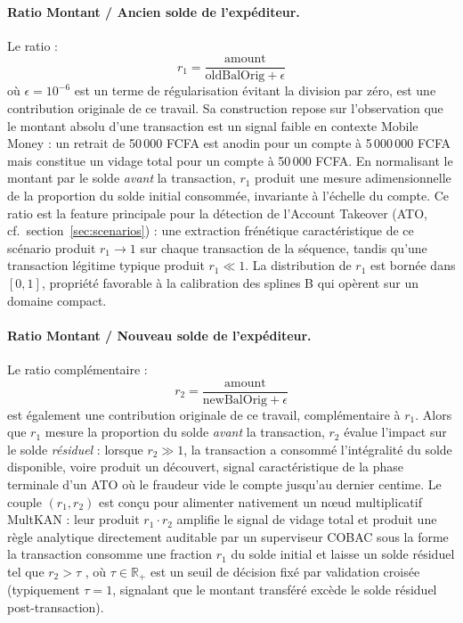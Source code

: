 \documentclass[11pt,a4paper,oneside]{report}
\theoremstyle{definition}
\theoremstyle{remark}
\begin{document}
\paragraph{Ratio Montant / Ancien solde de l'expéditeur.}
Le ratio :
\begin{equation}
    r_1 = \frac{\text{amount}}{\text{oldBalOrig} + \epsilon}
\end{equation}
où $\epsilon = 10^{-6}$ est un terme de régularisation évitant la division par zéro, est une contribution originale de ce travail. Sa construction repose sur l'observation que le montant absolu d'une transaction est un signal faible en contexte Mobile Money : un retrait de 50\,000 FCFA est anodin pour un compte à 5\,000\,000 FCFA mais constitue un vidage total pour un compte à 50\,000 FCFA. En normalisant le montant par le solde \emph{avant} la transaction, $r_1$ produit une mesure adimensionnelle de la proportion du solde initial consommée, invariante à l'échelle du compte. Ce ratio est la feature principale pour la détection de l'Account Takeover (ATO, cf.\ section~\ref{sec:scenarios}) : une extraction frénétique caractéristique de ce scénario produit $r_1 \rightarrow 1$ sur chaque transaction de la séquence, tandis qu'une transaction légitime typique produit $r_1 \ll 1$. La distribution de $r_1$ est bornée dans $[0, 1]$, propriété favorable à la calibration des splines B qui opèrent sur un domaine compact.

\paragraph{Ratio Montant / Nouveau solde de l'expéditeur.}
Le ratio complémentaire :
\begin{equation}
    r_2 = \frac{\text{amount}}{\text{newBalOrig} + \epsilon}
\end{equation}
est également une contribution originale de ce travail, complémentaire à $r_1$. Alors que $r_1$ mesure la proportion du solde \emph{avant} la transaction, $r_2$ évalue l'impact sur le solde \emph{résiduel} : lorsque $r_2 \gg 1$, la transaction a consommé l'intégralité du solde disponible, voire produit un découvert, signal caractéristique de la phase terminale d'un ATO où le fraudeur vide le compte jusqu'au dernier centime. Le couple $(r_1, r_2)$ est conçu pour alimenter nativement un nœud multiplicatif MultKAN : leur produit $r_1 \cdot r_2$ amplifie le signal de vidage total et produit une règle analytique directement auditable par un superviseur COBAC sous la forme \og la transaction consomme une fraction $r_1$ du solde initial et laisse un solde résiduel tel que $r_2 > \tau$ \fg{}, où $\tau \in \mathbb{R}_+$ est un seuil de décision fixé par validation croisée (typiquement $\tau = 1$, signalant que le montant transféré excède le solde résiduel post-transaction).
\end{document}
